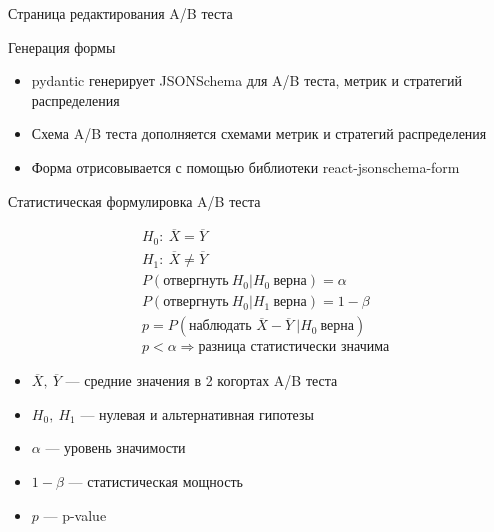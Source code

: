 \documentclass[12pt, unicode]{beamer}
\begin{document}
	\begin{frame}[fragile]{Страница редактирования A/B теста}
		\begin{block}{Генерация формы}
			\begin{itemize}
				\item pydantic генерирует JSONSchema для A/B теста, метрик и стратегий распределения
				\item Схема A/B теста дополняется схемами метрик и стратегий распределения
				\item Форма отрисовывается с помощью библиотеки react-jsonschema-form
			\end{itemize}
		\end{block}
	\end{frame}
	

	\begin{frame}[fragile]{Статистическая формулировка A/B теста}
		\begin{block}{}
			\vspace*{-0.8cm}
			\begin{equation}
				\begin{aligned}
					&H_0:\ \overline{X}=\overline{Y}\\
					&H_1:\ \overline{X}\ne\overline{Y}\\
					&P(\text{отвергнуть}\ H_0|H_0\ \text{верна})=\alpha\\
					&P(\text{отвергнуть}\ H_0|H_1\ \text{верна})=1-\beta\\
					&p = P(\text{наблюдать }\overline{X}-\overline{Y}\ |H_0\ \text{верна})\\
					&p<\alpha\Rightarrow\text{разница статистически значима}
				\end{aligned}
			\end{equation}
			\vspace*{-0.5cm}
			\begin{itemize}
				\item $\overline{X},\ \overline{Y}$ --- средние значения в 2 когортах A/B теста
				\item $H_0,\ H_1$ --- нулевая и альтернативная гипотезы
				\item $\alpha$ --- уровень значимости
				\item $1-\beta$ --- статистическая мощность
				\item $p$ --- p-value
			\end{itemize}
		\end{block}
	\end{frame}
	
\end{document}
